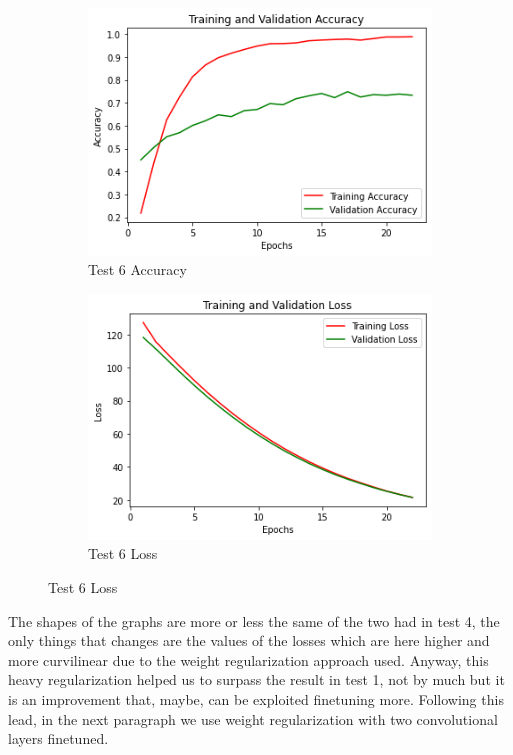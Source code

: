 \begin{figure}[H]
	\begin{subfigure}{0.5\textwidth}
		\includegraphics[width=0.9\linewidth]{img/vgg16/vgg16ft1dropregacc.png} 
		\caption{Test 6 Accuracy}
		\label{fig:vgg16ft1dropregacc}
	\end{subfigure}
	\begin{subfigure}{0.5\textwidth}
		\includegraphics[width=0.9\linewidth]{img/vgg16/vgg16ft1dropregloss.png}
		\caption{Test 6 Loss}
		\label{fig:vgg16ft1dropregloss}
	\end{subfigure}
\end{figure}

The shapes of the graphs are more or less the same of the two had in test 4, the only things that changes are the values of the losses which are here higher and more curvilinear due to the weight regularization approach used. Anyway, this heavy regularization helped us to surpass the result in test 1, not by much but it is an improvement that, maybe, can be exploited finetuning more. Following this lead, in the next paragraph we use weight regularization with two convolutional layers finetuned.






